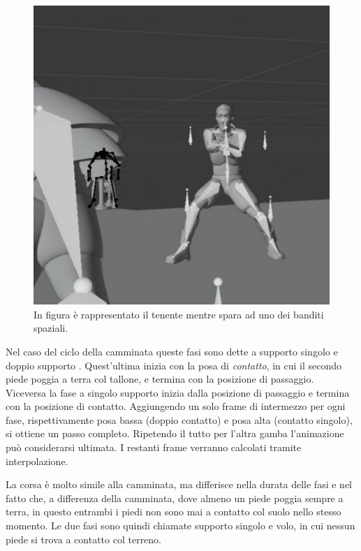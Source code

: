 \begin{figure}
\centering
\includegraphics[width=\textwidth]{Figures/screen6}
\decoRule
\caption[Scena esempio 6]{In figura è rappresentato il tenente mentre spara ad uno dei banditi spaziali.}
\label{fig:eg6}
\end{figure}
Nel caso del ciclo della camminata queste fasi sono dette a supporto singolo e doppio supporto \cite{Parent:2012:CAA:2385444}.
Quest'ultima inizia con la posa di \emph{contatto}, in cui il secondo piede poggia a terra col tallone, e termina con la posizione di passaggio.
Viceversa la fase a singolo supporto inizia dalla posizione di passaggio e termina con la posizione di contatto.
Aggiungendo un solo frame di intermezzo per ogni fase, rispettivamente posa bassa (doppio contatto) e posa alta (contatto singolo), si ottiene un passo completo. Ripetendo il tutto per l'altra gamba l'animazione può considerarsi ultimata. I restanti frame verranno calcolati tramite interpolazione.

La corsa è molto simile alla camminata, ma differisce nella durata delle fasi e nel fatto che, a differenza della camminata, dove almeno un piede poggia sempre a terra, in questo entrambi i piedi non sono mai a contatto col suolo nello stesso momento.
Le due fasi sono quindi chiamate supporto singolo e volo, in cui nessun piede si trova a contatto col terreno.

